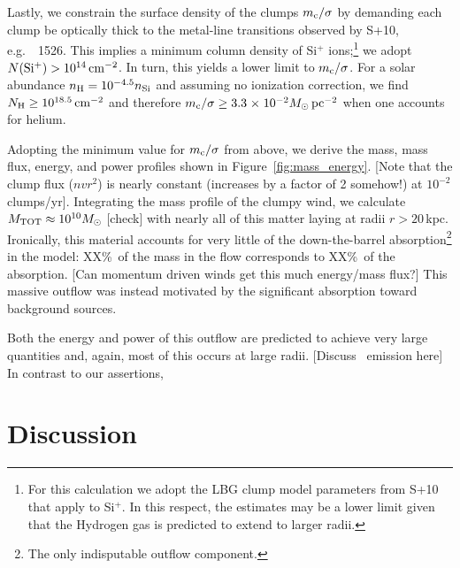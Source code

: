 \documentclass[12pt,preprint]{aastex}
\begin{document}
Lastly, we constrain the surface density of the clumps $m_{\rm
  c}/\sigma$ by demanding each clump be optically thick to the
metal-line transitions observed by S+10, e.g.\ ~1526.  
This implies a minimum column density of Si$^+$ ions;\footnote{For this
  calculation we adopt the LBG clump model parameters from S+10 that
  apply to Si$^+$.  In this respect, the estimates may be a lower
  limit given that the Hydrogen gas is predicted to extend to larger
  radii.} 
we adopt
${N({\rm Si^+})} > 10^{14} \, {\rm cm^{-2}}$.  In turn, this yields a lower limit to
$m_{\rm c}/\sigma$.  For a solar abundance $n_{\rm H} = 10^{-4.5}
n_{\rm Si}$ and assuming no ionization correction, we find $N_{\rm H}
\ge 10^{18.5} \, {\rm cm^{-2}}$ and therefore $m_{\rm c} / \sigma \ge 3.3
{\; \times \; 10^{-2}} M_\odot \, \rm pc^{-2}$ when one accounts for helium.

Adopting the minimum value for $m_{\rm c}/\sigma$ from above,  we derive the mass,
mass flux, energy, and power profiles shown in
Figure~\ref{fig:mass_energy}.
[Note that the clump flux ($nvr^2$) is nearly constant (increases by a
factor of 2 somehow!) at $10^{-2}$ clumps/yr].
Integrating the mass profile of the clumpy wind, we calculate 
$M_{\rm TOT} \approx 10^{10} M_\odot$ [check] with nearly all of this
matter laying at radii $r>20$\,kpc.  Ironically, this material accounts for very little
of the down-the-barrel absorption\footnote{The only indisputable
  outflow component.} in the model: XX\%\ of the mass in the flow
corresponds to XX\%\ of the absorption.  
[Can momentum driven winds get this much energy/mass flux?]
This massive outflow was instead motivated by the significant
absorption toward background sources.

Both the energy and power of this outflow are predicted to achieve
very large quantities and, again, most of this occurs at large radii.
[Discuss \lya\ emission here]
In contrast to our assertions,

\section{Discussion}
\label{sec:discussion}
\end{document}

